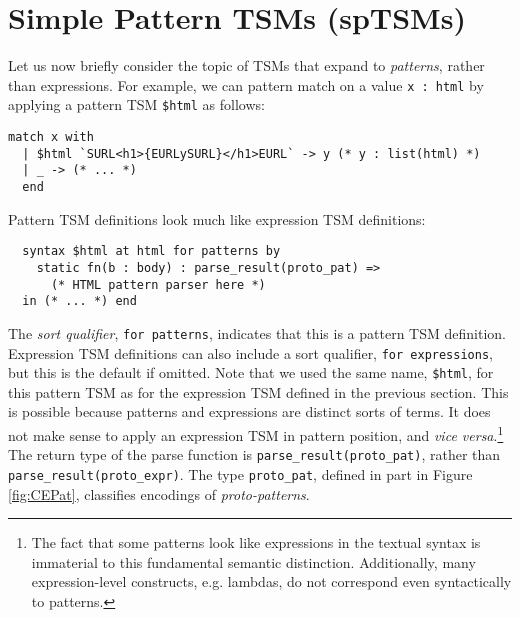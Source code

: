 \documentclass[acmlarge,review,anonymous]{acmart}\settopmatter{printfolios=true}
\newcommand{\li}[1]{\lstinline{#1}}
\begin{document}




\newcommand{\spTSMsSec}{Simple Pattern TSMs (spTSMs)}
\section{\protect\spTSMsSec}
\label{sec:sptsms}
Let us now briefly consider the topic of TSMs that expand to \emph{patterns}, rather than expressions. For example, we can pattern match on a value \li{x : html} by applying a pattern TSM \li{$html} as follows:
\begin{lstlisting}[numbers=none]
  match x with 
  | $html `SURL<h1>{EURLySURL}</h1>EURL` -> y (* y : list(html) *)
  | _ -> (* ... *)
  end
\end{lstlisting}

Pattern TSM definitions look much like expression TSM definitions:
\begin{lstlisting}
  syntax $html at html for patterns by 
    static fn(b : body) : parse_result(proto_pat) => 
      (* HTML pattern parser here *)
  in (* ... *) end
\end{lstlisting}
The \emph{sort qualifier}, \li{for patterns}, indicates that this is a pattern TSM definition. Expression TSM definitions can also include a sort qualifier, \li{for expressions}, but this is the default if omitted. 
Note that we used the same name, \li{$html}, for this pattern TSM as for the expression TSM defined in the previous section. This is possible because patterns and expressions are distinct sorts of terms. It does not make sense to apply an expression TSM in pattern position, and \emph{vice versa}.\footnote{The fact that some patterns look like expressions in the textual syntax is immaterial to this fundamental semantic distinction. Additionally, many expression-level constructs, e.g. lambdas, do not correspond even syntactically to patterns.}  
The return type of the parse function is \li{parse_result(proto_pat)}, rather than \li{parse_result(proto_expr)}. The type \li{proto_pat}, defined in part in Figure \ref{fig:CEPat}, classifies encodings of \emph{proto-patterns}.
\end{document}
